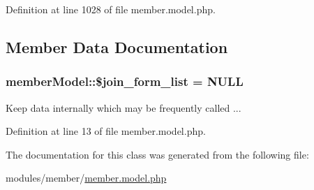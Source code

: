 Definition at line 1028 of file member.\-model.\-php.



\subsection{Member Data Documentation}
\hypertarget{classmemberModel_aa9b942e17ed74955c8700dd74d75d2b2}{
\subsubsection[{\$join\-\_\-form\-\_\-list}]{\setlength{\rightskip}{0pt plus 5cm}member\-Model\-::\$join\-\_\-form\-\_\-list = N\-U\-L\-L}}\label{classmemberModel_aa9b942e17ed74955c8700dd74d75d2b2}


Keep data internally which may be frequently called ... 



Definition at line 13 of file member.\-model.\-php.



The documentation for this class was generated from the following file\-:\begin{DoxyCompactItemize}
\item 
modules/member/\hyperlink{member_8model_8php}{member.\-model.\-php}\end{DoxyCompactItemize}
